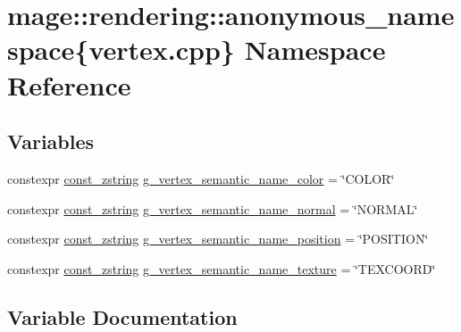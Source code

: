\hypertarget{namespacemage_1_1rendering_1_1anonymous__namespace_02vertex_8cpp_03}{}\section{mage\+:\+:rendering\+:\+:anonymous\+\_\+namespace\{vertex.\+cpp\} Namespace Reference}
\label{namespacemage_1_1rendering_1_1anonymous__namespace_02vertex_8cpp_03}
\subsection*{Variables}
\begin{DoxyCompactItemize}
\item 
constexpr \mbox{\hyperlink{namespacemage_abfd9206dc607ceb5d13ec68bf075a5c0}{const\+\_\+zstring}} \mbox{\hyperlink{namespacemage_1_1rendering_1_1anonymous__namespace_02vertex_8cpp_03_aae8cd813faec1e62d4e6463db8c99ab5}{g\+\_\+vertex\+\_\+semantic\+\_\+name\+\_\+color}} = \char`\"{}C\+O\+L\+OR\char`\"{}
\item 
constexpr \mbox{\hyperlink{namespacemage_abfd9206dc607ceb5d13ec68bf075a5c0}{const\+\_\+zstring}} \mbox{\hyperlink{namespacemage_1_1rendering_1_1anonymous__namespace_02vertex_8cpp_03_a1b4bf08af207f8c1681ecf617b094ef3}{g\+\_\+vertex\+\_\+semantic\+\_\+name\+\_\+normal}} = \char`\"{}N\+O\+R\+M\+AL\char`\"{}
\item 
constexpr \mbox{\hyperlink{namespacemage_abfd9206dc607ceb5d13ec68bf075a5c0}{const\+\_\+zstring}} \mbox{\hyperlink{namespacemage_1_1rendering_1_1anonymous__namespace_02vertex_8cpp_03_a6e875b92e4de38b14e8dc404df41a5ad}{g\+\_\+vertex\+\_\+semantic\+\_\+name\+\_\+position}} = \char`\"{}P\+O\+S\+I\+T\+I\+ON\char`\"{}
\item 
constexpr \mbox{\hyperlink{namespacemage_abfd9206dc607ceb5d13ec68bf075a5c0}{const\+\_\+zstring}} \mbox{\hyperlink{namespacemage_1_1rendering_1_1anonymous__namespace_02vertex_8cpp_03_a76de570f9dcc80db1e8e2f0a19536085}{g\+\_\+vertex\+\_\+semantic\+\_\+name\+\_\+texture}} = \char`\"{}T\+E\+X\+C\+O\+O\+RD\char`\"{}
\end{DoxyCompactItemize}


\subsection{Variable Documentation}
\mbox{\label{namespacemage_1_1rendering_1_1anonymous__namespace_02vertex_8cpp_03_aae8cd813faec1e62d4e6463db8c99ab5}} 
